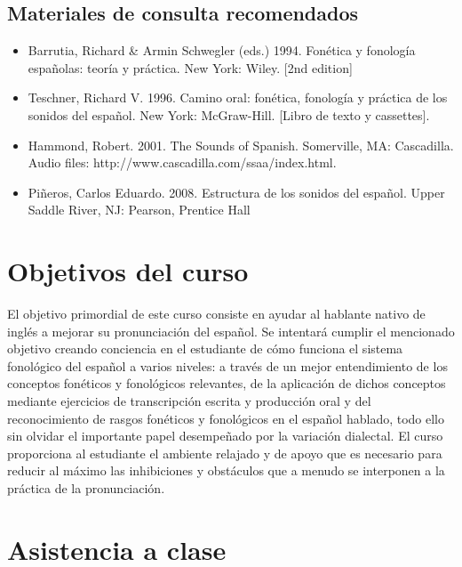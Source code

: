 \documentclass[12pt]{article}
\begin{document}
\subsection{Materiales de consulta recomendados}
\begin{singlespace}
	\begin{itemize}
	\itemsep=-2pt
		\item Barrutia, Richard \& Armin Schwegler (eds.) 1994. Fonética y fonología españolas: teoría y práctica.  New York: Wiley. [2nd edition] 
		\item Teschner, Richard V. 1996. Camino oral: fonética, fonología y práctica de los sonidos del español.  New York: McGraw-Hill. [Libro de texto y cassettes]. 
		\item Hammond, Robert. 2001. The Sounds of Spanish. Somerville, MA: Cascadilla. Audio files: http://www.cascadilla.com/ssaa/index.html.
		\item Piñeros, Carlos Eduardo. 2008. Estructura de los sonidos del español. Upper Saddle River, NJ: Pearson, Prentice Hall
	\end{itemize}
\end{singlespace}

\section{Objetivos del curso}
\begin{singlespace}
\noindent El objetivo primordial de este curso consiste en ayudar al hablante nativo de inglés a mejorar su pronunciación del español. Se intentará cumplir el mencionado objetivo creando conciencia en el estudiante de cómo funciona el sistema fonológico del español a varios niveles: a través de un mejor entendimiento de los conceptos fonéticos y fonológicos relevantes, de la aplicación de dichos conceptos mediante ejercicios de transcripción escrita y producción oral y del reconocimiento de rasgos fonéticos y fonológicos en el español hablado, todo ello sin olvidar el importante papel desempeñado por la variación dialectal. El curso proporciona al estudiante el ambiente relajado y de apoyo que es necesario para reducir al máximo las inhibiciones y obstáculos que a menudo se interponen a la práctica de la pronunciación.
\end{singlespace}

\section{Asistencia a clase}
\end{document}
